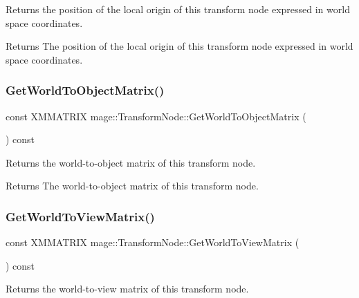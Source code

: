 Returns the position of the local origin of this transform node expressed in world space coordinates.

\begin{DoxyReturn}{Returns}
The position of the local origin of this transform node expressed in world space coordinates. 
\end{DoxyReturn}
\hypertarget{classmage_1_1_transform_node_a20bb6f313308bee29893be0685c884f9}{}\label{classmage_1_1_transform_node_a20bb6f313308bee29893be0685c884f9} 
\subsubsection{\texorpdfstring{Get\+World\+To\+Object\+Matrix()}{GetWorldToObjectMatrix()}}
{\footnotesize\ttfamily const X\+M\+M\+A\+T\+R\+IX mage\+::\+Transform\+Node\+::\+Get\+World\+To\+Object\+Matrix (\begin{DoxyParamCaption}{ }\end{DoxyParamCaption}) const}

Returns the world-\/to-\/object matrix of this transform node.

\begin{DoxyReturn}{Returns}
The world-\/to-\/object matrix of this transform node. 
\end{DoxyReturn}
\hypertarget{classmage_1_1_transform_node_a79572d99dea625ee4e05247c0f645ba9}{}\label{classmage_1_1_transform_node_a79572d99dea625ee4e05247c0f645ba9} 
\subsubsection{\texorpdfstring{Get\+World\+To\+View\+Matrix()}{GetWorldToViewMatrix()}}
{\footnotesize\ttfamily const X\+M\+M\+A\+T\+R\+IX mage\+::\+Transform\+Node\+::\+Get\+World\+To\+View\+Matrix (\begin{DoxyParamCaption}{ }\end{DoxyParamCaption}) const}

Returns the world-\/to-\/view matrix of this transform node.

